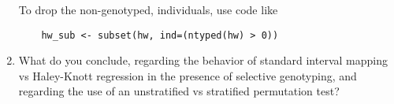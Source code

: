 \documentclass[12pt]{article}
\begin{document}
\begin{enumerate}
\bigskip
{\footnotesize
To drop the non-genotyped, individuals, use code like
\vspace{-12pt}
{\footnotesize
\begin{verbatim}
    hw_sub <- subset(hw, ind=(ntyped(hw) > 0))
\end{verbatim}
}}

\item What do you conclude, regarding the behavior of standard
  interval mapping vs Haley-Knott regression in the presence of
  selective genotyping, and regarding the use of an unstratified vs
  stratified permutation test?

\end{enumerate}
\end{document}
